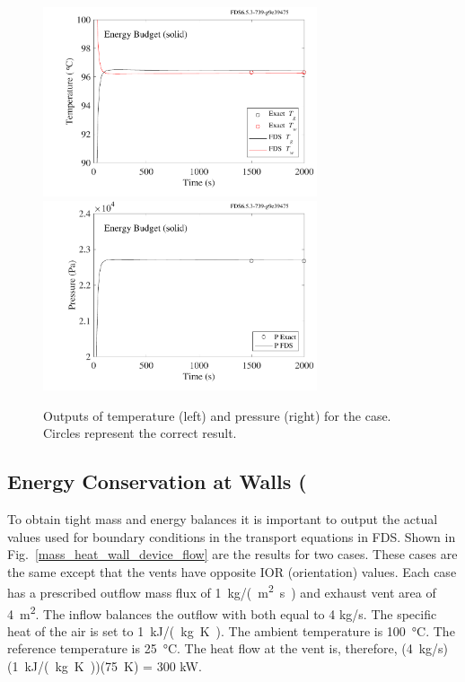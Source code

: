 \documentclass[11pt]{book}
\begin{document}
\begin{figure}[ht]
\includegraphics[height=2.2in]{SCRIPT_FIGURES/energy_budget_solid_T}
\includegraphics[height=2.2in]{SCRIPT_FIGURES/energy_budget_solid_P}
\caption[The  test case]{\label{fig_solid_energy} Outputs of temperature (left) and pressure (right) for the  case.  Circles represent the correct result.}
\end{figure}



\subsection{Energy Conservation at Walls (\texorpdfstring{})}
\label{mass_heat_wall_device_test}
\label{mass_heat_wall_device_test_2}

To obtain tight mass and energy balances it is important to output the actual values used for boundary conditions in the transport equations in FDS. Shown in Fig.~\ref{mass_heat_wall_device_flow} are the results for two cases.  These cases are the same except that the vents have opposite {\ct IOR} (orientation) values.  Each case has a prescribed outflow mass flux of 1~\si{kg/(m^2.s)} and exhaust vent area of 4~\si{m^2}. The inflow balances the outflow with both equal to 4 \si{kg/s}.  The specific heat of the air is set to 1~\si{kJ/(kg.K)}.  The ambient temperature is 100~\si{\degreeCelsius}.  The reference temperature is 25~\si{\degreeCelsius}.  The heat flow at the vent is, therefore, (4~\si{kg/s})(1~\si{kJ/(kg.K)})(75~K) = 300 kW.
\end{document}
